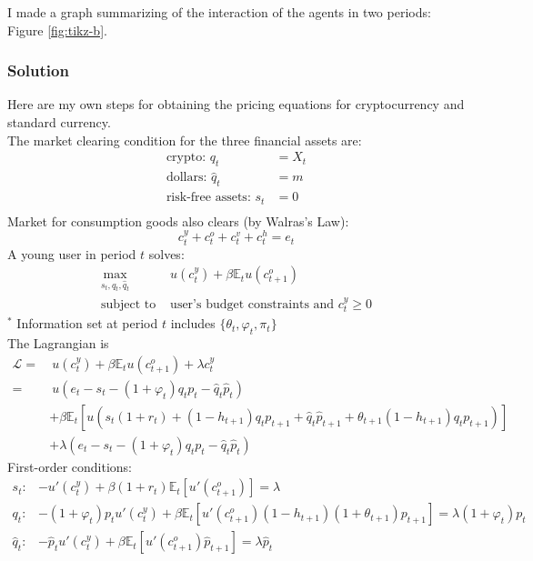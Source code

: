 \documentclass[12pt]{article}
\begin{document}
\noindent
I made a graph summarizing of the interaction of the agents in two periods: Figure \ref{fig:tikz-b}.



\subsubsection{Solution}
Here are my own steps for obtaining the pricing equations for cryptocurrency and standard currency.\\
The market clearing condition for the three financial assets are:
\begin{align}
    \text{crypto: } q_t &= X_t \\
    \text{dollars: } \hat{q}_t &= m \\
    \text{risk-free assets: } s_t &= 0 \\
\end{align}
Market for consumption goods also clears (by Walras's Law):
\begin{equation}
    c_t^y + c_t^o + c_t^v + c_t^h = e_t
\end{equation}
A young user in period $t$ solves:
\begin{align}
\max_{s_t, q_t, \hat{q}_t} &u(c_t^y) + \beta\mathbb{E}_t u(c_{t+1}^o)\\  
    \text{subject to  } & \text{user's budget constraints and } c_t^y \geq0 \nonumber
\end{align}
$^*$ Information set at period $t$ includes $ \{\theta_t, \varphi_t, \pi_t\}$ \\
The Lagrangian is
\begin{align}
    \mathcal{L} = &\ u(c_t^y) + \beta\mathbb{E}_t u(c_{t+1}^o) +\lambda c_t^y \nonumber \\ 
    = &\ u(e_t- s_t - (1+\varphi_t) q_t p_t - \hat{q}_t \hat{p}_t) \nonumber \\
    & + \beta \mathbb{E}_t\left[u(s_t (1+r_t) + (1-h_{t+1}) q_t p_{t+1} + \hat{q}_t \hat{p}_{t+1}
    + \theta_{t+1} (1-h_{t+1}) q_t p_{t+1}  ) \right] \nonumber \\
    & + \lambda (e_t- s_t - (1+\varphi_t) q_t p_t - \hat{q}_t \hat{p}_t)
\end{align}
First-order conditions:
\begin{align}
    s_t: & -u'(c_t^y) + \beta(1+r_t) \mathbb{E}_t[u'(c_{t+1}^o)] = \lambda\\
    q_t: & -(1+\varphi_t) p_t  u'(c_t^y) + \beta \mathbb{E}_t[u'(c_{t+1}^o)(1-h_{t+1})(1+\theta_{t+1})p_{t+1}] = \lambda (1+\varphi_t) p_t \\
    \hat{q}_t: & -\hat{p}_t u'(c_t^y) + \beta \mathbb{E}_t[u'(c_{t+1}^o) \hat{p}_{t+1}] = \lambda \hat{p}_t
\end{align}
\end{document}
